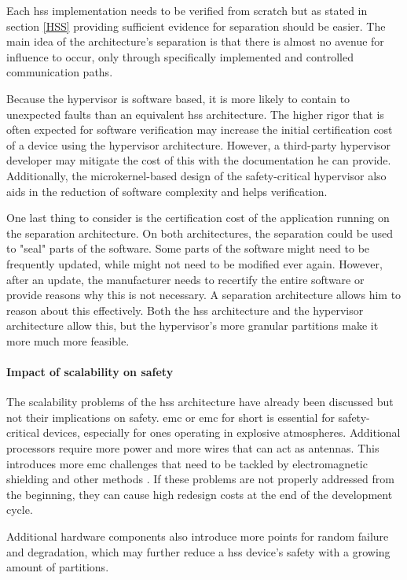 Each \acrshort{hss} implementation needs to be verified from scratch but as stated in section \ref{HSS} providing sufficient evidence for separation should be easier. The main idea of the architecture's separation is that there is almost no avenue for influence to occur, only through specifically implemented and controlled communication paths.

Because the hypervisor is software based, it is more likely to contain to unexpected faults than an equivalent \acrshort{hss} architecture. The higher rigor that is often expected for software verification may increase the initial certification cost of a device using the hypervisor architecture. However, a third-party hypervisor developer may mitigate the cost of this with the documentation he can provide. Additionally, the microkernel-based design of the safety-critical hypervisor also aids in the reduction of software complexity and helps verification.

One last thing to consider is the certification cost of the application running on the separation architecture. On both architectures, the separation could be used to "seal" parts of the software. Some parts of the software might need to be frequently updated, while might not need to be modified ever again.  However, after an update, the manufacturer needs to recertify the entire software or provide reasons why this is not necessary. A separation architecture allows him to reason about this effectively. Both the \acrshort{hss} architecture and the hypervisor architecture allow this, but the hypervisor's more granular partitions make it more much more feasible.

\paragraph{Impact of scalability on safety}
The scalability problems of the \acrshort{hss} architecture have already been discussed but not their implications on safety. \acrlong{emc} or \acrshort{emc} for short is essential for safety-critical devices, especially for ones operating in explosive atmospheres. Additional processors require more power and more wires that can act as antennas. This introduces more \acrshort{emc} challenges that need to be tackled by electromagnetic shielding and other methods \cite{perez2013safety}. If these problems are not properly addressed from the beginning, they can cause high redesign costs at the end of the development cycle.

Additional hardware components also introduce more points for random failure and degradation, which may further reduce a \acrshort{hss} device's safety with a growing amount of partitions.

